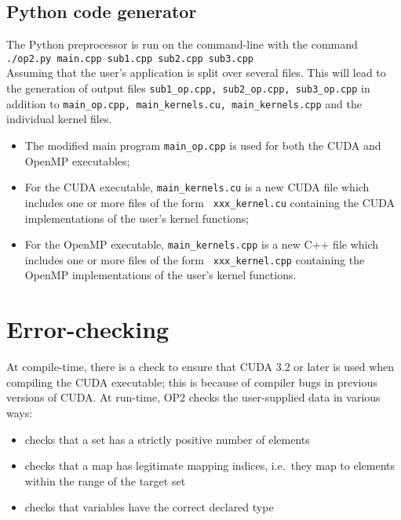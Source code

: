 \documentclass[11pt]{article}
\begin{document}

\subsection{Python code generator}

The Python preprocessor is run on the command-line with the command\\

{\tt ./op2.py main.cpp sub1.cpp sub2.cpp sub3.cpp}\\

\noindent Assuming that the user's application is split over several files. This will lead to the generation of output
files {\tt sub1\_op.cpp, sub2\_op.cpp, sub3\_op.cpp} in addition to {\tt main\_op.cpp, main\_kernels.cu,
main\_kernels.cpp} and the individual kernel files.

\begin{itemize}
\item
The modified main program {\tt main\_op.cpp} is used for both the CUDA and OpenMP executables;
\item
For the CUDA executable, {\tt main\_kernels.cu} is a new CUDA file which includes one or more files of the form {\tt
xxx\_kernel.cu} containing the CUDA implementations of the user's kernel functions;
\item
For the OpenMP executable, {\tt main\_kernels.cpp} is a new C++ file which includes one or more files of the form {\tt
xxx\_kernel.cpp} containing the OpenMP implementations of the user's kernel functions.
\end{itemize}



\section{Error-checking}

At compile-time, there is a check to ensure that CUDA 3.2 or later is used
when compiling the CUDA executable; this is because of compiler bugs in previous
versions of CUDA. At run-time, OP2 checks the user-supplied data in various ways:
\begin{itemize}
\item
checks that a set has a strictly positive number of elements
\item
checks that a map has legitimate mapping indices,
i.e.~they map to elements within the range of the target set
\item
checks that variables have the correct declared type
\end{itemize}
\end{document}
